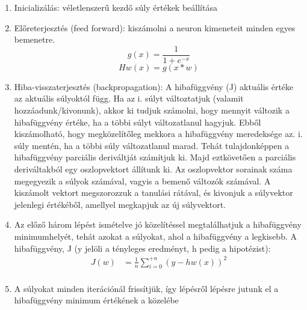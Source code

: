 \begin{enumerate}
	\item Inicializálás: véletlenszerű kezdő súly értékek beállítása
	\item Előreterjesztés (feed forward): kiszámolni a neuron kimeneteit minden egyes bemenetre.
	\[
    	g(x) = \frac{1}{1 + e^{-x}}
	\]
	\[
    	Hw(x) = g(x*w)
	\]
	\item Hiba-visszaterjesztés (backpropagation): A hibafüggvény (J) aktuális értéke az aktuális súlyoktól függ. Ha az i. súlyt változtatjuk (valamit hozzáadunk/kivonunk), akkor ki tudjuk számolni, hogy mennyit változik a hibafüggvény értéke, ha a többi súlyt változatlanul hagyjuk. Ebből kiszámolható, hogy megközelítőleg mekkora a hibafüggvény meredeksége az. i. súly mentén, ha a többi súly változatlanul marad. Tehát tulajdonképpen a hibafüggvény parciális deriváltját számítjuk ki. Majd eztkövetően  a parciális deriváltakból egy oszlopvektort állítunk ki. Az oszlopvektor sorainak száma megegyezik a súlyok számával, vagyis a bemenő változók számával. A kiszámolt vektort megszorozzuk a tanulási rátával, és kivonjuk a súlyvektor jelenlegi értékéből, amellyel megkapjuk az új súlyvektort.
	\item Az előző három lépést ismételve jó közelítéssel megtalálhatjuk a hibafüggvény minimumhelyét, tehát azokat a súlyokat, ahol a hibafüggvény a legkisebb.
A hibafüggvény, J (y jelöli a tényleges eredményt, h pedig a hipotézist):
	\begin{align*}
  		J(w) &= \frac{1}{n}\sum_{i=0}^{+n} (y - hw(x))^2 \\
	\end{align*}
	\item A súlyokat minden iterációnál frissítjük, így lépésről lépésre jutunk el a hibafüggvény minimum értékének a közelébe
\end{enumerate}
\paragraph{}